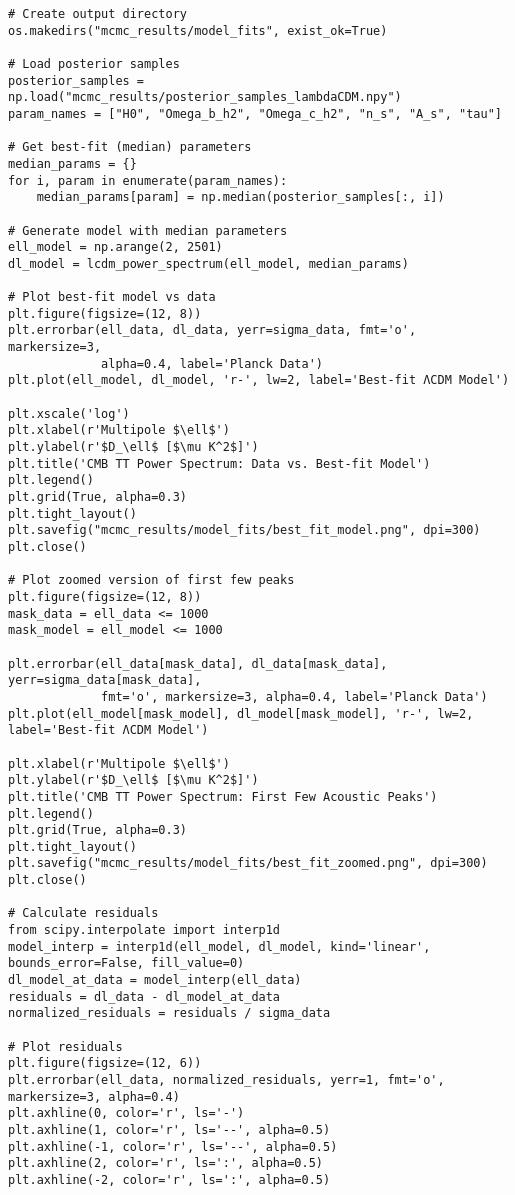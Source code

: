 \documentclass[11pt]{article}
\begin{document}
\begin{enumerate}
\begin{lstlisting}[basicstyle=\small\ttfamily]
# Create output directory
os.makedirs("mcmc_results/model_fits", exist_ok=True)

# Load posterior samples
posterior_samples = np.load("mcmc_results/posterior_samples_lambdaCDM.npy")
param_names = ["H0", "Omega_b_h2", "Omega_c_h2", "n_s", "A_s", "tau"]

# Get best-fit (median) parameters
median_params = {}
for i, param in enumerate(param_names):
    median_params[param] = np.median(posterior_samples[:, i])

# Generate model with median parameters
ell_model = np.arange(2, 2501)
dl_model = lcdm_power_spectrum(ell_model, median_params)

# Plot best-fit model vs data
plt.figure(figsize=(12, 8))
plt.errorbar(ell_data, dl_data, yerr=sigma_data, fmt='o', markersize=3, 
             alpha=0.4, label='Planck Data')
plt.plot(ell_model, dl_model, 'r-', lw=2, label='Best-fit ΛCDM Model')

plt.xscale('log')
plt.xlabel(r'Multipole $\ell$')
plt.ylabel(r'$D_\ell$ [$\mu K^2$]')
plt.title('CMB TT Power Spectrum: Data vs. Best-fit Model')
plt.legend()
plt.grid(True, alpha=0.3)
plt.tight_layout()
plt.savefig("mcmc_results/model_fits/best_fit_model.png", dpi=300)
plt.close()

# Plot zoomed version of first few peaks
plt.figure(figsize=(12, 8))
mask_data = ell_data <= 1000
mask_model = ell_model <= 1000

plt.errorbar(ell_data[mask_data], dl_data[mask_data], yerr=sigma_data[mask_data], 
             fmt='o', markersize=3, alpha=0.4, label='Planck Data')
plt.plot(ell_model[mask_model], dl_model[mask_model], 'r-', lw=2, label='Best-fit ΛCDM Model')

plt.xlabel(r'Multipole $\ell$')
plt.ylabel(r'$D_\ell$ [$\mu K^2$]')
plt.title('CMB TT Power Spectrum: First Few Acoustic Peaks')
plt.legend()
plt.grid(True, alpha=0.3)
plt.tight_layout()
plt.savefig("mcmc_results/model_fits/best_fit_zoomed.png", dpi=300)
plt.close()

# Calculate residuals
from scipy.interpolate import interp1d
model_interp = interp1d(ell_model, dl_model, kind='linear', bounds_error=False, fill_value=0)
dl_model_at_data = model_interp(ell_data)
residuals = dl_data - dl_model_at_data
normalized_residuals = residuals / sigma_data

# Plot residuals
plt.figure(figsize=(12, 6))
plt.errorbar(ell_data, normalized_residuals, yerr=1, fmt='o', markersize=3, alpha=0.4)
plt.axhline(0, color='r', ls='-')
plt.axhline(1, color='r', ls='--', alpha=0.5)
plt.axhline(-1, color='r', ls='--', alpha=0.5)
plt.axhline(2, color='r', ls=':', alpha=0.5)
plt.axhline(-2, color='r', ls=':', alpha=0.5)


\end{lstlisting}
\end{enumerate}
\end{document}

